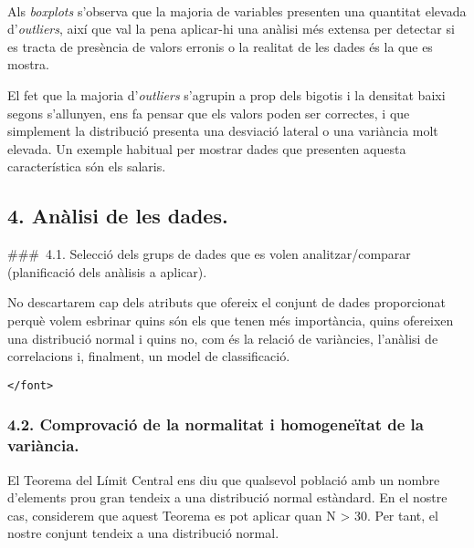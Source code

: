 \documentclass[11pt]{article}
\begin{document}
    \begin{center}
    \end{center}
    { \hspace*{\fill} \\}
    
    Als \emph{boxplots} s'observa que la majoria de variables presenten una
quantitat elevada d'\emph{outliers}, així que val la pena aplicar-hi una
anàlisi més extensa per detectar si es tracta de presència de valors
erronis o la realitat de les dades és la que es mostra.

El fet que la majoria d'\emph{outliers} s'agrupin a prop dels bigotis i
la densitat baixi segons s'allunyen, ens fa pensar que els valors poden
ser correctes, i que simplement la distribució presenta una desviació
lateral o una variància molt elevada. Un exemple habitual per mostrar
dades que presenten aquesta característica són els salaris.

    \hypertarget{analisi-de-les-dades.}{%
\subsection{4. Anàlisi de les dades.}\label{analisi-de-les-dades.}}

\#\#\#~4.1. Selecció dels grups de dades que es volen analitzar/comparar
(planificació dels anàlisis a aplicar).

    No descartarem cap dels atributs que ofereix el conjunt de dades
proporcionat perquè volem esbrinar quins són els que tenen més
importància, quins ofereixen una distribució normal i quins no, com és
la relació de variàncies, l'anàlisi de correlacions i, finalment, un
model de classificació.

\begin{verbatim}
</font>
\end{verbatim}

    \hypertarget{comprovacio-de-la-normalitat-i-homogeneitat-de-la-variancia.}{%
\subsubsection{4.2. Comprovació de la normalitat i homogeneïtat de la
variància.}\label{comprovacio-de-la-normalitat-i-homogeneitat-de-la-variancia.}}

    El Teorema del Límit Central ens diu que qualsevol població amb un
nombre d'elements prou gran tendeix a una distribució normal estàndard.
En el nostre cas, considerem que aquest Teorema es pot aplicar quan N
\textgreater{} 30. Per tant, el nostre conjunt tendeix a una distribució
normal.
\end{document}
